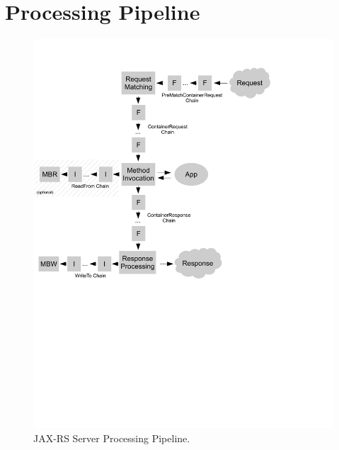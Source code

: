\chapter{Processing Pipeline}
\label{processing_pipeline}

\begin{figure}[H]
\label{pipeline_server}
\centering
\includegraphics{chapters/pipeline_server.pdf}
\caption{JAX-RS Server Processing Pipeline.}
\end{figure}

